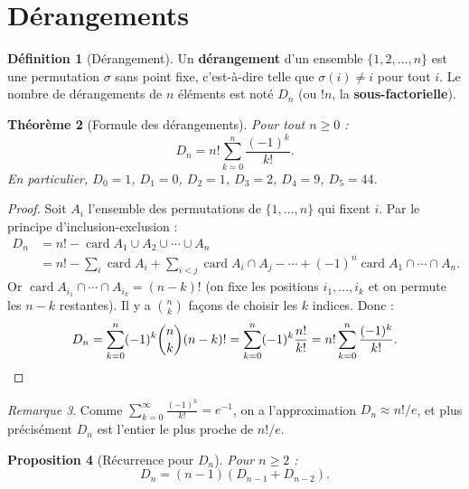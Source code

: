 \documentclass[12pt,a4paper,openany]{book}
\theoremstyle{definition}
\newtheorem{definition}{Définition}[chapter]
\theoremstyle{plain}
\newtheorem{theoreme}[definition]{Théorème}
\newtheorem{proposition}[definition]{Proposition}
\theoremstyle{remark}
\newtheorem{remarque}[definition]{Remarque}
\DeclareMathOperator{\card}{card}
\begin{document}
\section{Dérangements}\label{sec:derangements}

\begin{definition}[Dérangement]\label{def:derangement}
Un \textbf{dérangement} d'un ensemble $\{1, 2, \ldots, n\}$ est une
permutation $\sigma$ sans point fixe, c'est-à-dire telle que
$\sigma(i) \neq i$ pour tout $i$. Le nombre de dérangements de $n$ éléments
est noté $D_n$ (ou $!n$, la \textbf{sous-factorielle}).
\end{definition}

\begin{theoreme}[Formule des dérangements]\label{thm:derangements}
Pour tout $n \geq 0$ :
\[
  D_n = n! \sum_{k=0}^{n} \frac{(-1)^k}{k!}.
\]
En particulier, $D_0 = 1$, $D_1 = 0$, $D_2 = 1$, $D_3 = 2$, $D_4 = 9$,
$D_5 = 44$.
\end{theoreme}

\begin{proof}
Soit $A_i$ l'ensemble des permutations de $\{1,\ldots,n\}$ qui fixent $i$.
Par le principe d'inclusion-exclusion :
\begin{align*}
  D_n &= n! - \card{A_1 \cup A_2 \cup \cdots \cup A_n} \\
  &= n! - \sum_{i}\card{A_i} + \sum_{i<j}\card{A_i \cap A_j}
    - \cdots + (-1)^n \card{A_1 \cap \cdots \cap A_n}.
\end{align*}
Or $\card{A_{i_1} \cap \cdots \cap A_{i_k}} = (n-k)!$ (on fixe les positions
$i_1, \ldots, i_k$ et on permute les $n-k$ restantes). Il y a $\binom{n}{k}$
façons de choisir les $k$ indices. Donc :
\[
  D_n = \sum_{k=0}^{n} (-1)^k \binom{n}{k}(n-k)!
  = \sum_{k=0}^{n} (-1)^k \frac{n!}{k!}
  = n! \sum_{k=0}^{n} \frac{(-1)^k}{k!}. \qedhere
\]
\end{proof}

\begin{remarque}\label{rem:derangement-approx}
Comme $\displaystyle\sum_{k=0}^{\infty}\frac{(-1)^k}{k!} = e^{-1}$, on a
l'approximation $D_n \approx n!/e$, et plus précisément
$D_n$ est l'entier le plus proche de $n!/e$.
\end{remarque}

\begin{proposition}[Récurrence pour $D_n$]\label{prop:derangement-rec}
Pour $n \geq 2$ :
\[
  D_n = (n-1)(D_{n-1} + D_{n-2}).
\]
\end{proposition}
\end{document}
